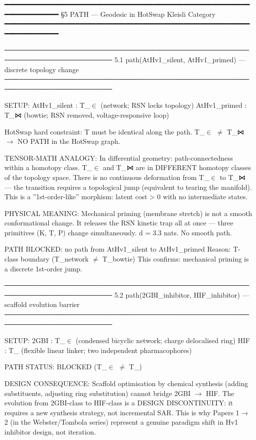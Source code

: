 \documentclass[12pt,a4paper]{article}
\begin{document}
━━━━━━━━━━━━━━━━━━━━━━━━━━━━━━━━━━━━━━━━━━━━━━━━━━━━━━━━━━━━━━━━━━━━━━━━
§5  PATH  ---  Geodesic in HotSwap Kleisli Category
━━━━━━━━━━━━━━━━━━━━━━━━━━━━━━━━━━━━━━━━━━━━━━━━━━━━━━━━━━━━━━━━━━━━━━━━

────────────────────────────────────────────────────────────────────────
5.1  path(AtHv1\_silent, AtHv1\_primed) --- discrete topology change
────────────────────────────────────────────────────────────────────────

SETUP:
AtHv1\_silent : T\_$\in$ (network; RSN locks topology)
AtHv1\_primed : T\_⋈ (bowtie; RSN removed, voltage-responsive loop)

HotSwap hard constraint: T must be identical along the path.
T\_$\in$ $\neq$ T\_⋈ $\rightarrow$ NO PATH in the HotSwap graph.

TENSOR-MATH ANALOGY:
In differential geometry: path-connectedness within a homotopy class.
T\_$\in$ and T\_⋈ are in DIFFERENT homotopy classes of the topology space.
There is no continuous deformation from T\_$\in$ to T\_⋈ --- the transition
requires a topological jump (equivalent to tearing the manifold).
This is a ''1st-order-like'' morphism: latent cost \textgreater{} 0 with no
intermediate states.

PHYSICAL MEANING:
Mechanical priming (membrane stretch) is not a smooth conformational
change. It releases the RSN kinetic trap all at once --- three primitives
(K, T, P) change simultaneously. d = 3.3 nats. No smooth path.

PATH BLOCKED: no path from AtHv1\_silent to AtHv1\_primed
Reason: T-class boundary (T\_network $\neq$ T\_bowtie)
This confirms: mechanical priming is a discrete 1st-order jump.

────────────────────────────────────────────────────────────────────────
5.2  path(2GBI\_inhibitor, HIF\_inhibitor) --- scaffold evolution barrier
────────────────────────────────────────────────────────────────────────

SETUP:
2GBI : T\_$\in$ (condensed bicyclic network; charge delocalised ring)
HIF  : T\_\textbar{} (flexible linear linker; two independent pharmacophores)

PATH STATUS: BLOCKED (T\_$\in$ $\neq$ T\_\textbar{})

DESIGN CONSEQUENCE:
Scaffold optimisation by chemical synthesis (adding substituents,
adjusting ring substitution) cannot bridge 2GBI $\rightarrow$ HIF.
The evolution from 2GBI-class to HIF-class is a DESIGN DISCONTINUITY:
it requires a new synthesis strategy, not incremental SAR.
This is why Papers 1$\rightarrow$2 (in the Webster/Tombola series) represent
a genuine paradigm shift in Hv1 inhibitor design, not iteration.
\end{document}
